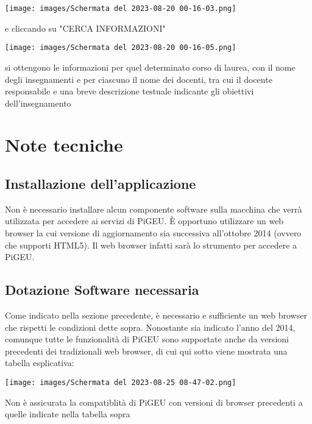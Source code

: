 \documentclass{article}
\begin{document}
    \texttt{[image: images/Schermata del 2023-08-20 00-16-03.png]}

    e cliccando su "CERCA INFORMAZIONI"

    \texttt{[image: images/Schermata del 2023-08-20 00-16-05.png]}

    si ottengono le informazioni per quel determinato corso di laurea, con il nome degli insegnamenti e per ciascuno il nome dei docenti, tra cui il docente responsabile e una breve descrizione testuale indicante gli obiettivi dell'insegnamento

    \section{Note tecniche}
    \subsection{Installazione dell'applicazione}
    Non è necessario installare alcun componente software sulla macchina che verrà utilizzata per accedere ai servizi di PiGEU. È opportuno utilizzare un web browser la cui versione di aggiornamento sia successiva all'ottobre 2014 (ovvero che supporti HTML5). Il web browser infatti sarà lo strumento per accedere a PiGEU.
    \subsection{Dotazione Software necessaria}
    Come indicato nella sezione precedente, è necessario e sufficiente un web browser che rispetti le condizioni dette sopra. Nonostante sia indicato l'anno del 2014, comunque tutte le funzionalità di PiGEU sono supportate anche da versioni precedenti dei tradizionali web browser, di cui qui sotto viene mostrata una tabella esplicativa:

    \texttt{[image: images/Schermata del 2023-08-25 08-47-02.png]}

    Non è assicurata la compatiblità di PiGEU con versioni di browser precedenti a quelle indicate nella tabella sopra
\end{document}
